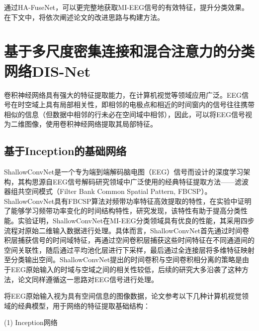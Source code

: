 通过HA-FuseNet，可以更完整地获取MI-EEG信号的有效特征，提升分类效果。在下文中，将依次阐述论文的改进思路与构建方法。

\section{基于多尺度密集连接和混合注意力的分类网络DIS-Net}

卷积神经网络具有强大的特征提取能力，在计算机视觉等领域应用广泛。EEG信号在时空域上具有局部相关性，即相邻的电极点和相近的时间窗内的信号往往携带相似的信息（但数据中相邻的行未必在空间域中相邻），因此，可以将EEG信号视为二维图像，使用卷积神经网络提取其局部特征。

\subsection{基于Inception的基础网络}

ShallowConvNet\cite{schirrmeister2017deep}是一个专为端到端解码脑电图（EEG）信号而设计的深度学习架构，其构思源自EEG信号解码研究领域中广泛使用的经典特征提取方法——滤波器组共空间模式（Filter Bank Common Spatial Pattern, FBCSP）\cite{ang2008filter}。ShallowConvNet具有FBCSP算法对频带功率特征高效提取的特性，在实验中证明了能够学习频带功率变化的时间结构特性\cite{schirrmeister2017deep}，研究发现，该特性有助于提高分类性能\cite{sakhavi2015parallel}。实验证明，ShallowConvNet在MI-EEG分类领域具有优良的性能\cite{lawhern2018eegnet}，其采用四步流程对原始二维输入数据进行处理。具体而言，ShallowConvNet首先通过时间卷积层捕获信号的时间域特征，再通过空间卷积层捕获这些时间特征在不同通道间的空间关联性，随后通过平均池化层进行下采样，最后通过全连接层将多维特征映射至分类输出空间。ShallowConvNet提出的时间卷积与空间卷积相分离的策略是由于EEG原始输入的时域与空域之间的相关性较低，后续的研究大多沿袭了这种方法，论文同样遵循这一思路对EEG信号进行处理。

将EEG原始输入视为具有空间信息的图像数据，论文参考以下几种计算机视觉领域的经典模型，用于网络的特征提取基础结构：

(1) Inception网络

